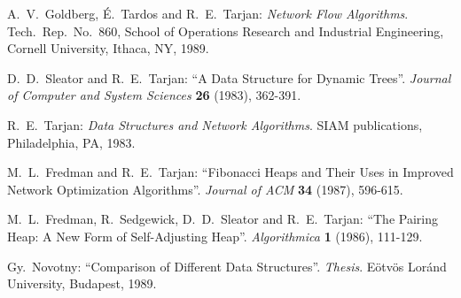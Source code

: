 \begin{thebibliography}{00}
{A.~V.~Goldberg, \'E.~Tardos and 
 R.~E.~Tarjan:
{\sl Network Flow Algorithms}.
Tech.\ Rep.\ No.~860,
School of Operations Research and Industrial Engineering,
Cornell University,
Ithaca, NY, 1989.

D.~D.~Sleator and R.~E.~Tarjan:
``A Data Structure for Dynamic Trees''.
{\sl Journal of Computer and System Sciences}
{\bf 26} (1983), 362-391.

R.~E.~Tarjan:
{\sl Data Structures and Network Algorithms}.
SIAM publications, Philadelphia, PA, 1983.

M.~L.~Fredman and R.~E.~Tarjan:
``Fibonacci Heaps and Their Uses in Improved Network Optimization
Algorithms''.
{\sl Journal of ACM}
{\bf 34} (1987), 596-615.

M.~L.~Fredman, R.~Sedgewick, D.~D.~Sleator and
R.~E.~Tarjan: 
``The Pairing Heap: A New Form of Self-Adjusting Heap''.
{\sl Algorithmica}
{\bf 1} (1986), 111-129.

Gy.~Novotny:
``Comparison of Different Data Structures''.
{\sl Thesis}.
E\"otv\"os Lor\'and University, Budapest, 1989.

} 
\end{thebibliography}


